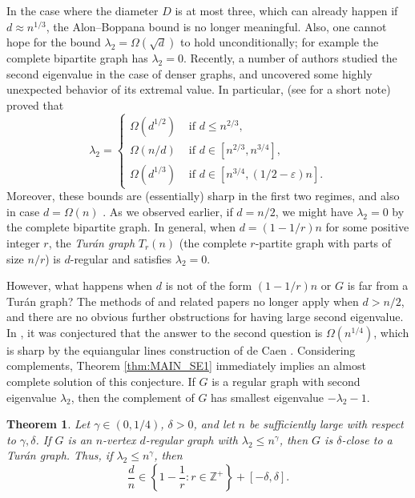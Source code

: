 \documentclass[11pt]{article}
\theoremstyle{plain}
\newtheorem{theorem}{Theorem}[section]
\theoremstyle{definition}
\newcommand{\eps}{\varepsilon}
\begin{document}
In the case where the diameter $D$ is at most three, which can already happen if $d\approx n^{1/3}$, the Alon--Boppana bound is no longer meaningful. Also, one cannot hope for the bound $\lambda_2=\Omega(\sqrt{d})$ to hold unconditionally; for example the complete bipartite graph has $\lambda_2=0$. Recently, a number of authors \cite{Balla21,BRST,Ihringer,RST} studied the second eigenvalue in the case of denser graphs, and uncovered some highly unexpected behavior of its extremal value. In particular, \cite{Balla21,RST} (see \cite{BRST} for a short note) proved that 
$$\lambda_2=\begin{cases}\Omega(d^{1/2}) &\mbox{ if } d\leq n^{2/3},\\
                        \Omega(n/d) &\mbox{ if } d\in [n^{2/3},n^{3/4}],\\
                        \Omega(d^{1/3}) &\mbox{ if } d\in [n^{3/4},(1/2-\eps)n].
            \end{cases}$$
Moreover, these bounds are (essentially) sharp in the first two regimes, and also in case $d=\Omega(n)$ \cite{DHJP}. As we observed earlier, if $d=n/2$, we might have $\lambda_2=0$ by the complete bipartite graph. In general, when $d=(1-1/r)n$ for some positive integer $r$, the \emph{Tur\'an graph} $T_r(n)$ (the complete $r$-partite graph with parts of size $n/r$) is $d$-regular and satisfies $\lambda_2=0$.

However, what happens when $d$ is not of the form $(1-1/r)n$ or $G$ is far from a Tur\'an graph? The methods of \cite{RST} and related papers no longer apply when $d>n/2$, and there are no obvious further obstructions for having large second eigenvalue. In \cite{RST}, it was conjectured that the answer to the second question is $\Omega(n^{1/4})$, which is sharp by the equiangular lines construction of de Caen \cite{deCaen}. Considering complements, Theorem \ref{thm:MAIN_SE1} immediately implies an almost complete solution of this conjecture. If $G$ is a regular graph with second eigenvalue $\lambda_2$, then the complement of $G$ has smallest eigenvalue $-\lambda_2-1$.

\begin{theorem}\label{thm:MAIN_AB}
Let $\gamma\in (0, 1/4)$, $\delta>0$, and let $n$ be sufficiently large with respect to $\gamma,\delta$. If $G$ is an $n$-vertex $d$-regular graph with $\lambda_2\leq n^{\gamma}$, then $G$ is $\delta$-close to a Tur\'an graph. Thus, if $\lambda_2\leq n^{\gamma}$, then $$\frac{d}{n}\in \left\{1-\frac{1}{r}:r\in \mathbb{Z}^+\right\}+[-\delta,\delta].$$ 
\end{theorem}
\end{document}
